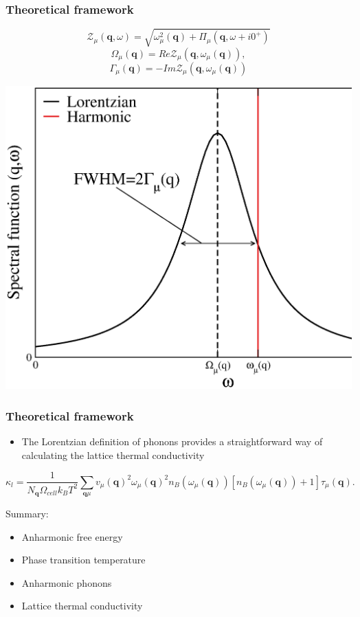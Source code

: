 \documentclass{beamer}
\begin{document}
\begin{frame}

\frametitle{Theoretical framework}
\begin{equation}
\nonumber
\mathcal{Z}_{\mu}(\mathbf{q},\omega)=\sqrt{\omega_{\mu}^{2}(\mathbf{q})+\Pi_{\mu}(\mathbf{q},\omega+i0^{+})}
\end{equation}
\begin{equation}
\nonumber
 \Omega_{\mu}(\mathbf{q})=Re\mathcal{Z}_{\mu}(\mathbf{q},\omega_{\mu}(\mathbf{q})),
\end{equation}
\begin{equation}
\nonumber
 \Gamma_{\mu}(\mathbf{q})=-Im\mathcal{Z}_{\mu}(\mathbf{q},\omega_{\mu}(\mathbf{q}))
\end{equation}
\begin{center}
  \includegraphics[width=0.6\linewidth]{Pictures/THEORY/ins-toy2.eps}
 \end{center}

\end{frame}


\begin{frame}

\frametitle{Theoretical framework}
\begin{itemize}
 \item The Lorentzian definition of phonons provides a straightforward way of calculating the lattice thermal conductivity
\end{itemize}
\begin{equation}
\nonumber
 \kappa_{l}=\frac{1}{N_{\mathbf{q}}\Omega_{cell} k_{B}T^{2}}\sum_{\mathbf{q}\mu}v_{\mu}(\mathbf{q})^{2}\omega_{\mu}(\mathbf{q})^{2}n_{B}(\omega_{\mu}(\mathbf{q}))[n_{B}(\omega_{\mu}(\mathbf{q}))+1]\tau_{\mu}(\mathbf{q}).
\end{equation}

Summary:
\begin{itemize}
\item Anharmonic free energy
\item Phase transition temperature
\item Anharmonic phonons
\item Lattice thermal conductivity
\end{itemize}

\end{frame}
\end{document}
